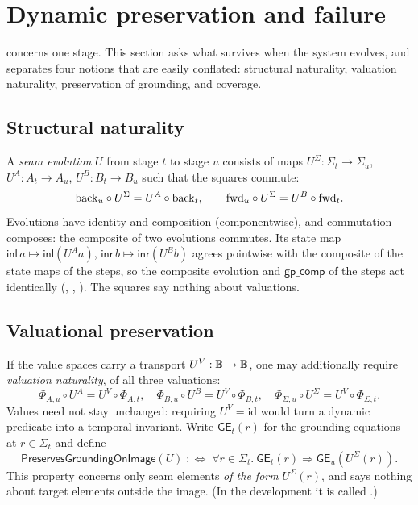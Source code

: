 \section{Dynamic preservation and failure}\label{sec:dynamic}

 concerns one stage. This section asks what survives when the system evolves, and separates four notions that are easily conflated: structural naturality, valuation naturality, preservation of grounding, and coverage.

\subsection{Structural naturality}
A \emph{seam evolution} $U$ from stage $t$ to stage $u$ consists of maps $U^\Sigma : \Sigma_t \to \Sigma_u$, $U^A : A_t \to A_u$, $U^B : B_t \to B_u$ such that the squares commute:
\[
\mathrm{back}_u \circ U^\Sigma = U^A \circ \mathrm{back}_t, \qquad \mathrm{fwd}_u \circ U^\Sigma = U^B \circ \mathrm{fwd}_t.
\]
Evolutions have identity and composition (componentwise), and commutation composes: the composite of two evolutions commutes. Its state map $\mathsf{inl}\,a \mapsto \mathsf{inl}(U^A a)$, $\mathsf{inr}\,b \mapsto \mathsf{inr}(U^B b)$ agrees pointwise with the composite of the state maps of the steps, so the composite evolution and $\mathsf{gp\_comp}$ of the steps act identically (, , ). The squares say nothing about valuations.

\subsection{Valuational preservation}\label{sec:valuational}
If the value spaces carry a transport $U^V : \mathbb{B} \to \mathbb{B}$, one may additionally require \emph{valuation naturality}, of all three valuations:
\[
\Phi_{A,u} \circ U^A = U^V \circ \Phi_{A,t}, \quad
\Phi_{B,u} \circ U^B = U^V \circ \Phi_{B,t}, \quad
\Phi_{\Sigma,u} \circ U^\Sigma = U^V \circ \Phi_{\Sigma,t}.
\]
Values need not stay unchanged: requiring $U^V = \mathrm{id}$ would turn a dynamic predicate into a temporal invariant. Write $\mathsf{GE}_t(r)$ for the grounding equations at $r \in \Sigma_t$ and define
\[
\mathsf{PreservesGroundingOnImage}(U) \;:\Longleftrightarrow\; \forall r \in \Sigma_t.\ \mathsf{GE}_t(r) \Rightarrow \mathsf{GE}_u(U^\Sigma(r)).
\]
This property concerns only seam elements \emph{of the form} $U^\Sigma(r)$, and says nothing about target elements outside the image. (In the development it is called .)

